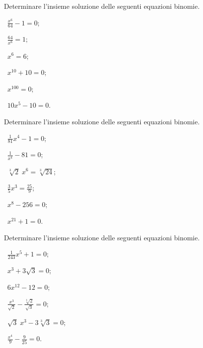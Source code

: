 \begin{esercizio}
 \label{ese:5.17}
Determinare l'insieme soluzione delle seguenti equazioni binomie.
\begin{multicols}{3}
 \begin{enumeratea}
 \item~$\frac{x^6}{64}-1=0$;
 \item~$\frac{64}{x^6}=1$;
 \item~$x^6=6$;
 \item~$x^{10}+10=0$;
 \item~$x^{100}=0$;
 \item~$10x^5-10=0$.
 \end{enumeratea}
 \end{multicols}
\end{esercizio}

\begin{esercizio}[\Ast]
 \label{ese:5.18}
Determinare l'insieme soluzione delle seguenti equazioni binomie.
\begin{multicols}{3}
 \begin{enumeratea}
 \item~$\frac 1{81}x^4-1=0$;
 \item~$\frac 1{x^4}-81=0$;
 \item~$\sqrt[3]2\;x^6=\sqrt[3]{24}$;
 \item~$\frac 3 5x^3=\frac{25} 9$;
 \item~$x^8-256=0$;
 \item~$x^{21}+1=0$.
 \end{enumeratea}
 \end{multicols}
\end{esercizio}

\begin{esercizio}[\Ast]
 \label{ese:5.19}
Determinare l'insieme soluzione delle seguenti equazioni binomie.
\begin{multicols}{3}
 \begin{enumeratea}
 \item~$\frac 1{243}x^5+1=0$;
 \item~$x^3+3\sqrt 3=0$;
 \item~$6x^{12}-12=0$;
 \item~$\frac{x^3}{\sqrt 2}-\frac{\sqrt[3]2}{\sqrt 3}=0$;
 \item~$\sqrt 3\;x^3-3\sqrt[3]3=0$;
 \item~$\frac{x^4} 9-\frac 9{25}=0$.
 \end{enumeratea}
 \end{multicols}
\end{esercizio}

